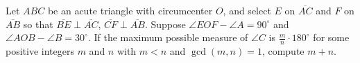 Let $ABC$ be an acute triangle with circumcenter $O$, and select $E$ on $\overline{AC}$ and $F$ on $\overline{AB}$ so that $\overline{BE} \perp \overline{AC}$, $\overline{CF} \perp \overline{AB}$.  Suppose $\angle EOF - \angle A = 90^{\circ}$ and $\angle AOB - \angle B = 30^{\circ}$.  If the maximum possible measure of $\angle C$ is $\tfrac mn \cdot 180^{\circ}$ for some positive integers $m$ and $n$ with $m < n$ and $\gcd(m,n)=1$, compute $m+n$.
